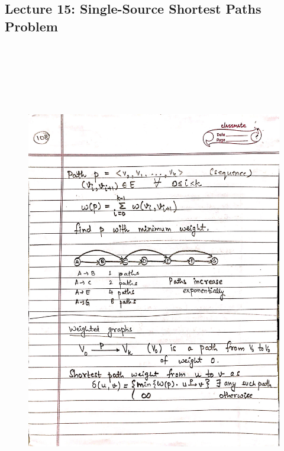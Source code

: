 \newpage
{\color{black} \subsection*{Lecture 15: Single-Source Shortest Paths Problem}}
\begin{figure}[H]
    \centering
    \includegraphics[width=16cm, height=21cm]{"./MIT-6.006/MIT-6006-108"}
\end{figure}

